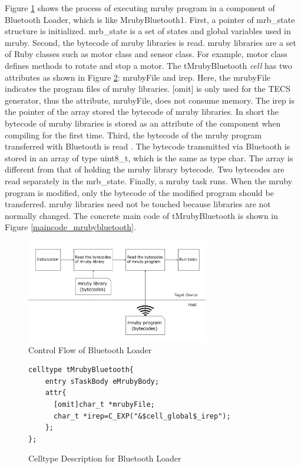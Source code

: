 \documentclass[conference,compsoc]{IEEEtran}
\begin{document}
Figure \ref{fig:control_flow} shows the process of executing mruby program in a component of Bluetooth Loader, which is like MrubyBluetooth1.
First, a pointer of mrb\_state structure is initialized.
mrb\_state is a set of states and global variables used in mruby.
Second, the bytecode of mruby libraries is read.
mruby libraries are a set of Ruby classes such as motor class and sensor class.
For example, motor class defines methods to rotate and stop a motor.
The tMrubyBluetooth {\it cell} has two attributes as shown in Figure \ref{celltype_mrubybluetooth}: mrubyFile and irep.
Here, the mrubyFile indicates the program files of mruby libraries.
[omit] is only used for the TECS generator, thus the attribute, mrubyFile, does not consume memory.
The irep is the pointer of the array stored the bytecode of mruby libraries.
In short the bytecode of mruby libraries is stored as an attribute of the component when compiling for the first time.
Third, the bytecode of the mruby program transferred with Bluetooth is read .
The bytecode transmitted via Bluetooth is stored in an array of type uint8\_t, which is the same as type char.
The array is different from that of holding the mruby library bytecode.
Two bytecodes are read separately in the mrb\_state.
Finally, a mruby task runs.
When the mruby program is modified, only the bytecode of the modified program should be transferred.
mruby libraries need not be touched because libraries are not normally changed.
The concrete main code of tMrubyBluetooth is shown in Figure \ref{maincode_mrubybluetooth}.
\begin{figure}[t]
    \centering
    \includegraphics[width=8cm,clip]{figure/control_flow.pdf}
    \caption{Control Flow of Bluetooth Loader}
    \label{fig:control_flow}
\end{figure}
\begin{figure}[t]
\centering
\begin{lstlisting}
celltype tMrubyBluetooth{
    entry sTaskBody eMrubyBody;
    attr{
      [omit]char_t *mrubyFile;
      char_t *irep=C_EXP("&$cell_global$_irep");
    };
}; 
\end{lstlisting}
\caption{Celltype Description for Bluetooth Loader}
\label{celltype_mrubybluetooth}
\end{figure}
\end{document}
